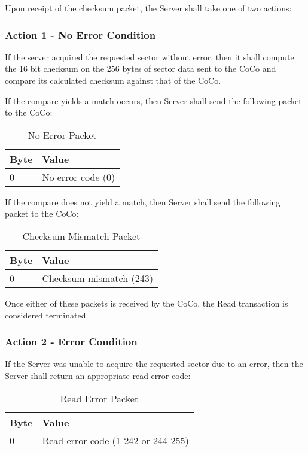 \documentclass{article}
\begin{document}
Upon receipt of the checksum packet, the Server shall take one of two actions:

\subsubsection{Action 1 - No Error Condition}

If the server acquired the requested sector without error, then it shall compute the 16 bit checksum on the 256 bytes of sector data sent to the CoCo and compare its calculated checksum against that of the CoCo.

If the compare yields a match occurs, then Server shall send the following packet to the CoCo:

\begin{table}[ht]
\caption{No Error Packet}
\begin{center}
\begin{tabular}{|ll|}
\hline
Byte & Value \\ \hline
0 & No error code (0) \\
\hline
\end{tabular}
\end{center}
\end{table}

If the compare does not yield a match, then Server shall send the following packet to the CoCo:

\begin{table}[ht]
\caption{Checksum Mismatch Packet}
\begin{center}
\begin{tabular}{|ll|}
\hline
Byte & Value \\ \hline
0 & Checksum mismatch (243) \\
\hline
\end{tabular}
\end{center}
\end{table}

Once either of these packets is received by the CoCo, the Read transaction is considered terminated.

\subsubsection{Action 2 - Error Condition}

If the Server was unable to acquire the requested sector due to an error, then the Server shall return an appropriate read error code:

\begin{table}[ht]
\caption{Read Error Packet}
\begin{center}
\begin{tabular}{|ll|}
\hline
Byte & Value \\ \hline
0 & Read error code (1-242 or 244-255) \\
\hline
\end{tabular}
\end{center}
\end{table}
\end{document}

